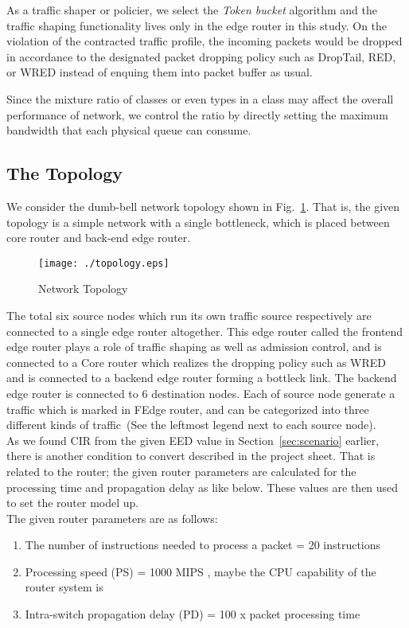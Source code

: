 \documentclass[letterpaper, 10 pt, conference]{ieeeconf}  %
\begin{document}
As a traffic shaper or policier, we select the \emph{Token bucket} algorithm
and the traffic shaping functionality lives only in the edge router in this study. 
On the violation of the contracted traffic profile, the incoming
packets would be dropped in accordance to the designated packet dropping policy
such as DropTail, RED, or WRED instead of enquing them into packet buffer as usual.

Since the mixture ratio of classes or even types in a class may affect the
overall performance of network, we control the ratio by directly setting the
maximum bandwidth that each physical queue can consume. 

\subsection{\bf{The Topology}}
\label{sec:topology}
\noindent 
We consider the dumb-bell network topology shown in Fig.~\ref{fig:topo}. 
That is, the given topology is a simple network with a single bottleneck, 
which is placed between core router and  back-end edge router. 

\begin{figure}[t]
\centering
\texttt{[image: ./topology.eps]}
\caption{
Network Topology
}
\label{fig:topo}
\end{figure}

The total six source nodes which run its own traffic source respectively are
connected to a single edge router altogether. This edge router called the frontend edge
router plays a role of traffic shaping as well as admission control, and is connected to a Core router which
realizes the dropping policy such as WRED and is connected to a backend
edge router forming a bottleck link. The backend edge router is connected to 6
destination nodes. Each of source node generate a traffic which is marked in
FEdge router, and can be categorized into three different kinds of traffic~(See
the leftmost legend next to each source node).\\

As we found CIR from the given EED value in Section~\ref{sec:scenario} earlier, there is another
condition to convert described in the project sheet. That is related to the
router; the given router parameters are calculated for the processing time and propagation delay as like
below. These values are then used to set the router model up.\\

The given router parameters are as follows: 
\begin{enumerate}
\item The number of instructions needed to process a packet =  20 instructions
\item Processing speed (PS) =  1000 MIPS , maybe the CPU capability of the router system is  
\item Intra-switch propagation delay (PD) = 100 x packet processing time 
\end{enumerate} 
\end{document}
